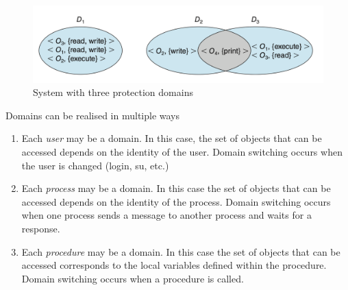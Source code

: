 \documentclass[oneside]{book}
\begin{document}
                    \begin{figure}[H]
                        \centering
                        \includegraphics[width=0.6\linewidth]{figures/protection_domains_3.png}
                        \caption{System with three protection domains}
                    \end{figure}
                    Domains can be realised in multiple ways
                    \begin{enumerate}
                        \item Each \textit{user} may be a domain. In this case, the set of objects that can be accessed depends on the identity of the 
                        user. Domain switching occurs when the user is changed (login, su, etc.)
                        \item Each \textit{process} may be a domain. In this case the set of objects that can be accessed depends on the identity of the
                        process. Domain switching occurs when one process sends a message to another process and waits for a response.
                        \item Each \textit{procedure} may be a domain. In this case the set of objects that can be accessed corresponds to the local variables
                        defined within the procedure. Domain switching occurs when a procedure is called.
                    \end{enumerate}
\end{document}
